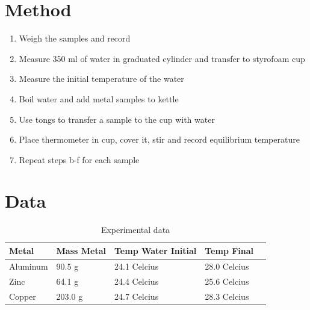 \documentclass{article}
\begin{document}
\section{Method}

\begin{enumerate}
\item Weigh the samples and record
\item Measure 350 ml of water in graduated cylinder and transfer to styrofoam cup
\item Measure the initial temperature of the water
\item Boil water and add metal samples to kettle
\item Use tongs to transfer a sample to the cup with water
\item Place thermometer in cup, cover it, stir and record equilibrium temperature
\item Repeat steps b-f for each sample

\end{enumerate}


\section{Data}

\begin{table}[htbp]
\begin{center}
\footnotesize
\begin{tabular}{lllll}
\toprule
 Metal   & Mass Metal & Temp Water Initial & Temp Final \\                                                      
\midrule
  
    Aluminum   & 90.5 g           & 24.1 Celcius & 28.0 Celcius   \\
    Zinc   & 64.1 g           & 24.4 Celcius  & 25.6 Celcius  \\
    Copper     & 203.0 g           & 24.7 Celcius & 28.3 Celcius  \\
    
\bottomrule
\end{tabular}
\end{center}
  \caption{Experimental data}
  \label{tab:font-sizes}
\end{table}
\end{document}
